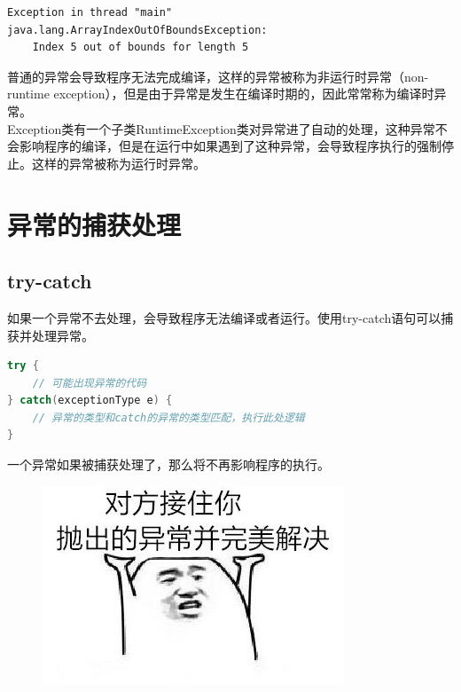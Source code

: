 \begin{tcolorbox}
	\begin{verbatim}
Exception in thread "main"
java.lang.ArrayIndexOutOfBoundsException:
    Index 5 out of bounds for length 5
	\end{verbatim}
\end{tcolorbox}

普通的异常会导致程序无法完成编译，这样的异常被称为非运行时异常（non-runtime exception），但是由于异常是发生在编译时期的，因此常常称为编译时异常。\\

Exception类有一个子类RuntimeException类对异常进了自动的处理，这种异常不会影响程序的编译，但是在运行中如果遇到了这种异常，会导致程序执行的强制停止。这样的异常被称为运行时异常。

\newpage

\section{异常的捕获处理}

\subsection{try-catch}

如果一个异常不去处理，会导致程序无法编译或者运行。使用try-catch语句可以捕获并处理异常。

\vspace{-0.5cm}

\begin{lstlisting}[language=Java]
try {
    // 可能出现异常的代码
} catch(exceptionType e) {
    // 异常的类型和catch的异常的类型匹配，执行此处逻辑
}
\end{lstlisting}

一个异常如果被捕获处理了，那么将不再影响程序的执行。

\begin{figure}[H]
	\centering
	\includegraphics{img/C10/10-2/1.png}
\end{figure}

